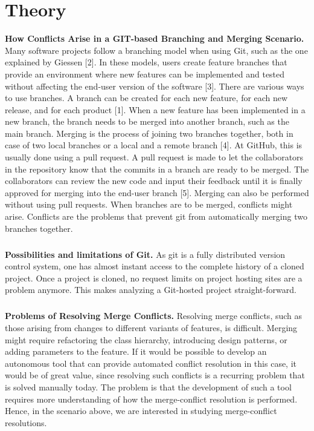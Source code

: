 \chapter{Theory}
\textbf{How Conflicts Arise in a GIT-based Branching and Merging Scenario.} Many software projects follow a branching model when using Git, such as the one explained by Giessen [2]. In these models, users create feature branches that provide an environment where new features can be implemented and tested without affecting the end-user version of the software [3]. There are various ways to use branches. A branch can be created for each new feature, for each new release, and for each product [1]. When a new feature has been implemented in a new branch, the branch needs to be merged into another branch, such as the main branch. Merging is the process of joining two branches together, both in case of two local branches or a local and a remote branch [4]. At GitHub, this is usually done using a pull request. A pull request is made to let the collaborators in the repository know that the commits in a branch are ready to be merged. The collaborators can review the new code and input their feedback until it is finally approved for merging into the end-user branch [5]. Merging can also be performed without using pull requests. When branches are to be merged, conflicts might arise. Conflicts are the problems that prevent git from automatically merging two branches together.

\paragraph*{}
\textbf{Possibilities and limitations of Git.} As git is a fully distributed version control system, one has almost instant access to the complete history of a cloned project. Once a project is cloned, no request limits on project hosting sites are a problem anymore. This makes analyzing a Git-hosted project straight-forward.

\paragraph*{}
\textbf{Problems of Resolving Merge Conflicts.} Resolving merge conflicts, such as those arising from changes to different variants of features, is difficult. Merging might require refactoring the class hierarchy, introducing design patterns, or adding parameters to the feature. If it would be possible to develop an autonomous tool that can provide automated conflict resolution in this case, it would be of great value, since resolving such conflicts is a recurring problem that is solved manually today. The problem is that the development of such a tool requires more understanding of how the merge-conflict resolution is performed. Hence, in the scenario above, we are interested in studying merge-conflict resolutions.

